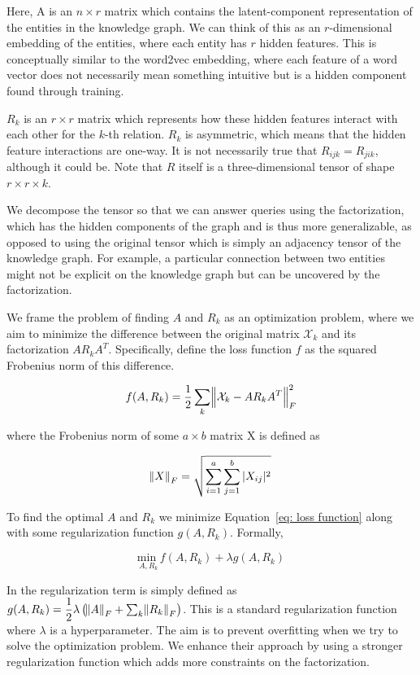 \documentclass[pageno]{final_paper}
\begin{document}
Here, A is an $n\times r$ matrix which contains the latent-component
representation of the entities in the knowledge graph. We can think of this as
an $r$-dimensional embedding of the entities, where each entity has $r$ hidden
features. This is conceptually similar to the word2vec embedding, where each
feature of a word vector does not necessarily mean something intuitive but is a
hidden component found through training.

$R_k$ is an $r\times r$ matrix which represents how these hidden features
interact with each other for the $k$-th relation. $R_k$ is asymmetric, which
means that the hidden feature interactions are one-way. It is not necessarily
true that $R_{ijk} = R_{jik}$, although it could be. Note that $R$ itself is a
three-dimensional tensor of shape $r\times r\times k$.

We decompose the tensor so that we can answer queries using the factorization,
which has the hidden components of the graph and is thus more generalizable, as
opposed to using the original tensor which is simply an adjacency tensor of the
knowledge graph. For example, a particular connection between two entities might
not be explicit on the knowledge graph but can be uncovered by the
factorization.

We frame the problem of finding $A$ and $R_k$ as an optimization problem, where
we aim to minimize the difference between the original matrix $\mathcal{X}_k$
and its factorization $AR_kA^T$. Specifically, define the loss function $f$ as
the squared Frobenius norm of this difference.

\begin{equation}
\label{eq: loss function}
    f(A, R_k) = \dfrac{1}{2} \sum_k \norm{\mathcal{X}_k - AR_kA^T}_F^2
\end{equation}

where the Frobenius norm of some $a\times b$ matrix X is defined as

$$\norm{X}_F = \sqrt{\sum_{i=1}^a \sum_{j=1}^b |X_{ij}|^2}$$

To find the optimal $A$ and $R_k$ we minimize Equation~\eqref{eq: loss function}
along with some regularization function $g(A, R_k)$. Formally,

\begin{equation}
    \label{eq: to minimize}
    \underset{A, R_k}{\text{min }} f(A,R_k) + \lambda g(A, R_k)
\end{equation}

In \cite{Nickel2011}\cite{Chang2014} the regularization term is simply defined
as $g(A, R_k) = \dfrac{1}{2}\lambda \left(\norm{A}_F + \sum_k
\norm{R_k}_F\right)$. This is a standard regularization function where $\lambda$
is a hyperparameter. The aim is to prevent overfitting when we try to solve the
optimization problem. We enhance their approach by using a stronger
regularization function which adds more constraints on the factorization.
\end{document}
